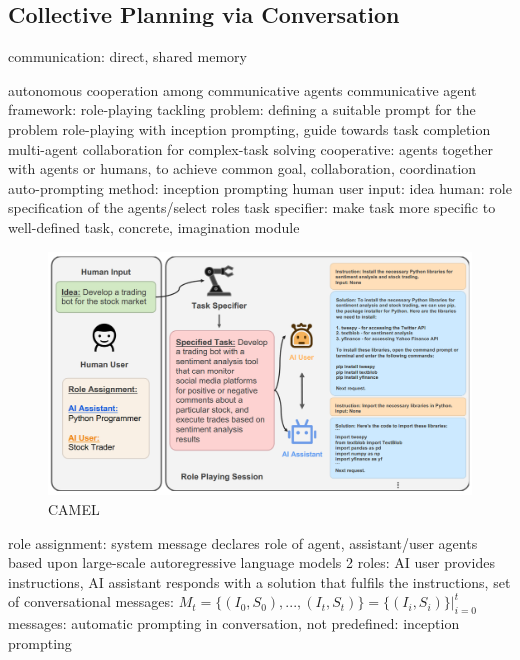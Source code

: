 \documentclass{article}
\begin{document}
\subsection{Collective Planning via Conversation}
communication: direct, shared memory

\cite{li_camel_2023}
autonomous cooperation among communicative agents
communicative agent framework: role-playing
tackling problem: defining a suitable prompt for the problem
role-playing with inception prompting, guide towards task completion
multi-agent collaboration for complex-task solving
cooperative: agents together with agents or humans, to achieve common goal, collaboration, coordination
auto-prompting method: inception prompting
human user input: idea
human: role specification of the agents/select roles
task specifier: make task more specific to well-defined task, concrete, imagination module
\begin{figure}[h]
	\centering
	\includegraphics[width=0.9\linewidth]{CAMEL}
	\caption{CAMEL \cite{li_camel_2023}}
	\label{fig:camel}
\end{figure}
role assignment: system message declares role of agent, assistant/user agents based upon large-scale autoregressive language models
2 roles: AI user provides instructions, AI assistant responds with a solution that fulfils the instructions,  set of conversational messages:
$M_t = \{(I_0,S_0),...,(I_t,S_t)\}=\{(I_i,S_i)\}\vert^{t}_{i=0}$
messages: automatic prompting in conversation, not predefined: inception prompting
\end{document}

